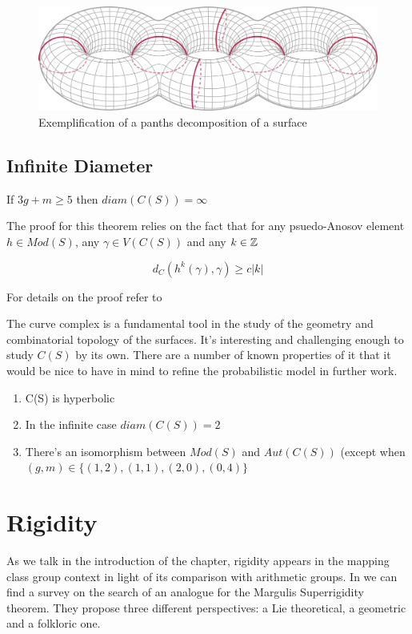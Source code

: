 \vspace{1cm}
\begin{figure}[h!]
	\centering
	\includegraphics[scale=0.4]{Figures/Pantalones.png}
	\caption{Exemplification of a panths decomposition of a surface}
\end{figure}

\subsection{Infinite Diameter}
\begin{theorem}
If $3g+m\geq 5$ then $diam(C(S)) = \infty$
\end{theorem}

The proof for this theorem relies on the fact that for any psuedo-Anosov element $h \in Mod(S)$, any $\gamma \in V(C(S))$ and any $k\in \mathbb{Z}$

$$d_{C}(h^{k}(\gamma), \gamma) \geq c|k|$$
 
For details on the proof refer to \cite[Masur and Minsky]{Masur}

The curve complex is a fundamental tool in the study of the geometry and combinatorial topology of the surfaces. It's interesting and challenging enough to study $C(S)$ by its own. There are a number of known properties of it that it would be nice to have in mind to refine the probabilistic model in further work.

\begin{enumerate}
\item C(S) is hyperbolic
\item In the infinite case $diam(C(S))= 2$
\item There's an isomorphism between $Mod(S)$ and $Aut(C(S))$ (except when $(g,m) \in \{(1,2), (1,1), (2,0), (0,4)\}$
\end{enumerate}

\section{Rigidity}

As we talk in the introduction of the chapter, rigidity appears in the mapping class group context in light of its comparison with arithmetic groups. In \cite[Aramayona, S.]{rigidityJA} we can find a survey on the search of an analogue for the Margulis Superrigidity theorem. They propose three different perspectives: a Lie theoretical, a geometric and a folkloric one.

